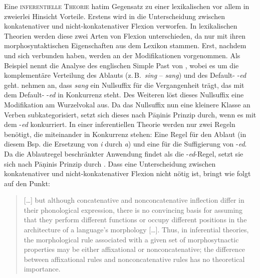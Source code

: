 Eine \textsc{inferentielle Theorie} hat\largerpage im Gegensatz zu einer lexikalischen vor allem in zweierlei Hinsicht Vorteile. Erstens wird in  die Unterscheidung zwischen konkatenativer und nicht-konkatenativer Flexion verworfen. In lexikalischen Theorien werden diese zwei Arten von Flexion unterschieden, da nur  mit ihren morphosyntaktischen Eigenschaften aus dem Lexikon stammen. Erst, nachdem  und  sich verbunden haben, werden an der  Modifikationen vorgenommen. Als Beispiel nennt \citet{Stump2001} die Analyse des englischen Simple Past von \citet{HalleMarantz1993}, wobei es um die komplementäre Verteilung des Ablauts (z.\,B.\ \textit{sing} – \textit{sang}) und des Default- -\textit{ed} geht. \citet{HalleMarantz1993} nehmen an, dass \textit{sang} ein Nullsuffix für die Vergangenheit trägt, das mit dem Default- -\textit{ed} in Konkurrenz steht. Des Weiteren löst dieses Nullsuffix eine Modifikation am Wurzelvokal aus. Da das Nullsuffix nun eine kleinere Klasse an Verben subkategorisiert, setzt sich dieses  nach P\=aṇinis Prinzip durch, wenn es mit dem  -\textit{ed} konkurriert. In einer inferentiellen Theorie werden nur zwei Regeln benötigt, die miteinander in Konkurrenz stehen: Eine Regel für den Ablaut (in diesem Bsp. die Ersetzung von \textit{i} durch \textit{a}) und eine für die Suffigierung von -\textit{ed}. Da die Ablautregel beschränkter Anwendung findet als die -\textit{ed}-Regel, setzt sie sich nach P\=aṇinis Prinzip durch \citep[10]{Stump2001}. Dass eine Unterscheidung zwischen konkatenativer und nicht-konkatenativer Flexion nicht nötig ist, bringt \citet{Stump2001} wie folgt auf den Punkt:

\begin{quote}
[…] but although concatenative and nonconcatenative inflection differ in their phonological expression, there is no convincing basis for assuming that they perform different functions or occupy different positions in the architecture of a language’s morphology […]. Thus, in inferential theories, the morphological rule associated with a given set of morphosytnactic properties may be either affixational or nonconcatenative; the difference between affixational rules and nonconcatenative rules has no theoretical importance. \citep[9]{Stump2001}
\end{quote}

